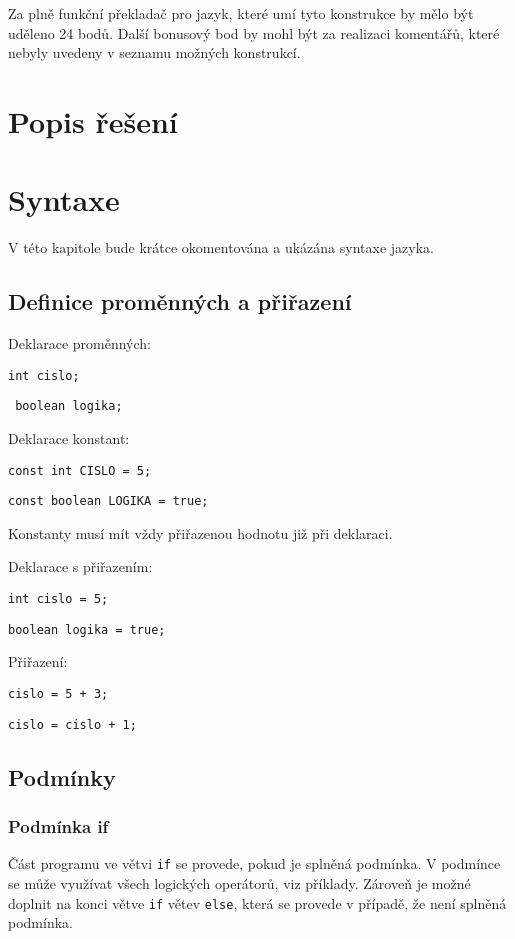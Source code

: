 \documentclass[czech]{thesiskiv}
\begin{document}
\noindent Za plně funkční překladač pro jazyk, které umí tyto konstrukce by mělo být uděleno 24 bodů.
Další bonusový bod by mohl být za realizaci komentářů, které nebyly uvedeny v seznamu možných konstrukcí.

\chapter{Popis řešení}

\chapter{Syntaxe}
V této kapitole bude krátce okomentována a ukázána syntaxe jazyka.

\section{Definice proměnných a přiřazení}

Deklarace proměnných:

\texttt{int cislo;}

\texttt{
boolean logika;}

\noindent Deklarace konstant:

\texttt{const int CISLO = 5;}

\texttt{const boolean LOGIKA = true;}

\noindent Konstanty musí mít vždy přiřazenou hodnotu již při deklaraci.

\noindent Deklarace s přiřazením: 

\texttt{int cislo = 5;}

\texttt{boolean logika = true;}

\noindent Přiřazení:

\texttt{cislo = 5 + 3;}

\texttt{cislo = cislo + 1;}

\section{Podmínky}
\subsection{Podmínka if}
Část programu ve větvi \texttt{if} se provede, pokud je splněná podmínka.
V podmínce se může využívat všech logických operátorů, viz příklady.
Zároveň je možné doplnit na konci větve \texttt{if} větev \texttt{else}, která 
se provede v případě, že není splněná podmínka.
\end{document}
